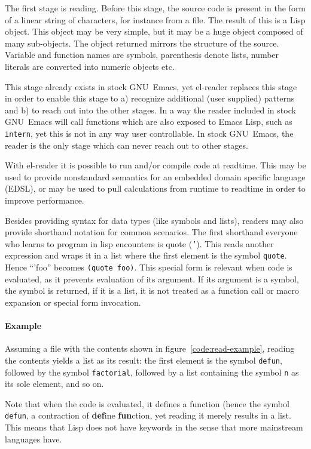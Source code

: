 \documentclass[a4paper,10pt,twoside]{report}
\newcommand{\el}{Emacs Lisp}
\newcommand{\elr}{el-reader}
\newcommand{\sym}[1]{\texttt{#1}}
\newcommand{\fun}[1]{\texttt{#1}}
\newcommand{\emacs}{GNU~Emacs}
\begin{document}
The first stage is reading.  Before this stage, the source code is present in
the form of a linear string of characters, for instance from a file.  The result
of this is a Lisp object.  This object may be very simple, but it may be a huge
object composed of many sub-objects.  The object returned mirrors the structure
of the source.  Variable and function names are symbols, parenthesis denote
lists, number literals are converted into numeric objects etc.

This stage already exists in stock \emacs{}, yet \elr{} replaces this stage in
order to enable this stage to a) recognize additional (user supplied) patterns
and b) to reach out into the other stages.  In a way the reader included in
stock \emacs{} will call functions which are also exposed to \el{}, such as
\fun{intern}, yet this is not in any way user controllable.  In stock \emacs{},
the reader is the only stage which can never reach out to other stages.

With \elr{} it is possible to run and/or compile code at readtime.  This may be
used to provide nonstandard semantics for an embedded domain specific language
(EDSL), or may be used to pull calculations from runtime to readtime in order to
improve performance.

Besides providing syntax for data types (like symbols and lists), readers may
also provide shorthand notation for common scenarios.  The first shorthand
everyone who learns to program in lisp encounters is quote (\sym{'}).  This
reads another expression and wraps it in a list where the first element is the
symbol \sym{quote}.  Hence ``'foo'' becomes \texttt{(quote foo)}.  This special
form is relevant when code is evaluated, as it prevents evaluation of its
argument.  If its argument is a symbol, the symbol is returned, if it is a list,
it is not treated as a function call or macro expansion or special form
invocation.

\paragraph{Example}
\label{par:read-example}

Assuming a file with the contents shown in figure~\ref{code:read-example},
reading the contents yields a list as its result: the first element is the
symbol \fun{defun}, followed by the symbol \sym{factorial}, followed by a list
containing the symbol \sym{n} as its sole element, and so on.

Note that when the code is evaluated, it defines a function (hence the symbol
\sym{defun}, a contraction of \textbf{def}ine \textbf{fun}ction, yet reading it
merely results in a list.  This means that Lisp does not have keywords in the
sense that more mainstream languages have.
\end{document}
